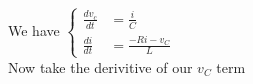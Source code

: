 \documentclass[preview]{standalone}
\begin{document}
\begin{center}
We have \(\left\{
                    \begin{aligned}
                        \frac{dv_c}{dt} &= \frac{i}{C} \\
                        \frac{di}{dt} &= \frac{-Ri - v_C}{L}
                    \end{aligned}
                    \right.\) \\ Now take the derivitive of our $v_C$ term
\end{center}
\end{document}
